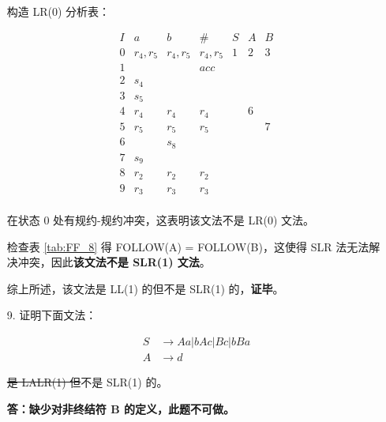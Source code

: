 \begin{enumerate}
    构造 LR(0) 分析表：
    
    \begin{equation*}
        \begin{array}{c|ccc|ccc}
            I & a & b & \# & S & A & B \\
            \hline
            0 & r_4, r_5 & r_4, r_5 & r_4, r_5 & 1 & 2 & 3 \\
            1 & & & acc & & & \\
            2 & s_4 & & & & & \\
            3 & s_5 & & & & & \\
            4 & r_4 & r_4 & r_4 & & 6 & \\
            5 & r_5 & r_5 & r_5 & & & 7 \\
            6 & & s_8 & & & & \\
            7 & s_9 & & & & & \\
            8 & r_2 & r_2 & r_2 & & & \\
            9 & r_3 & r_3 & r_3 & & & \\
        \end{array}
    \end{equation*}
    
    在状态 0 处有规约-规约冲突，这表明该文法不是 LR(0) 文法。
    
    检查表 \ref{tab:FF_8} 得 FOLLOW(A) = FOLLOW(B)，这使得 SLR 法无法解决冲突，因此\textbf{该文法不是 SLR(1) 文法}。
    
    综上所述，该文法是 LL(1) 的但不是 SLR(1) 的，\textbf{证毕}。
    
    \item[9.] 证明下面文法：
    
    \begin{align*}
        S & \to Aa | bAc | Bc | bBa \\
        A & \to d
    \end{align*}
    
    \sout{是 LALR(1) 但}不是 SLR(1) 的。
    
    \textbf{答：缺少对非终结符 B 的定义，此题不可做。}
    
    
    
    

\end{enumerate}
